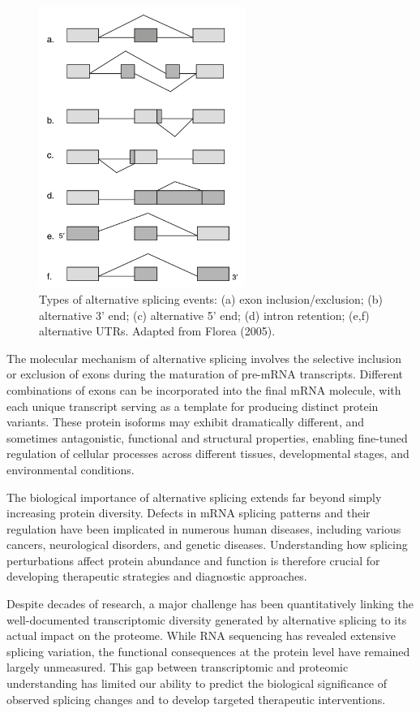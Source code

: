\documentclass[12pt,a4paper]{article}
\begin{document}
\begin{figure}[H]
\centering
\includegraphics[width=0.6\textwidth]{alt_splicing_figure_1_florea.png}
\caption{Types of alternative splicing events: (a) exon inclusion/exclusion; (b) alternative 3' end; (c) alternative 5' end; (d) intron retention; (e,f) alternative UTRs. Adapted from Florea (2005).}
\label{fig:alt_splicing_types}
\end{figure}

The molecular mechanism of alternative splicing involves the selective inclusion or exclusion of exons during the maturation of pre-mRNA transcripts. Different combinations of exons can be incorporated into the final mRNA molecule, with each unique transcript serving as a template for producing distinct protein variants. These protein isoforms may exhibit dramatically different, and sometimes antagonistic, functional and structural properties, enabling fine-tuned regulation of cellular processes across different tissues, developmental stages, and environmental conditions.

The biological importance of alternative splicing extends far beyond simply increasing protein diversity. Defects in mRNA splicing patterns and their regulation have been implicated in numerous human diseases, including various cancers, neurological disorders, and genetic diseases. Understanding how splicing perturbations affect protein abundance and function is therefore crucial for developing therapeutic strategies and diagnostic approaches.

Despite decades of research, a major challenge has been quantitatively linking the well-documented transcriptomic diversity generated by alternative splicing to its actual impact on the proteome. While RNA sequencing has revealed extensive splicing variation, the functional consequences at the protein level have remained largely unmeasured. This gap between transcriptomic and proteomic understanding has limited our ability to predict the biological significance of observed splicing changes and to develop targeted therapeutic interventions.
\end{document}
